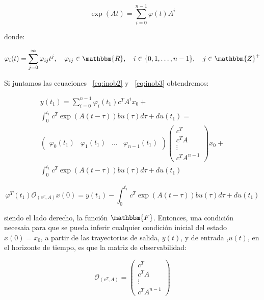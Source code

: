 	\begin{equation} \label{eq:inob3}
		\exp{(At)} = \sum_{i=0}^{n-1} \varphi(t) A^i
	\end{equation}

	donde:

	\begin{equation*}
		\varphi_i(t) = \sum_{j=0}^{\infty} \varphi_{ij} t^j, \quad \varphi_{ij} \in \mathbbm{R}, \quad i \in \{ 0, 1, \dots , n-1 \}, \quad j \in \mathbbm{Z}^+
	\end{equation*}

	Si juntamos las ecuaciones ~\ref{eq:inob2} y ~\ref{eq:inob3} obtendremos:

	\begin{multline*}
		y(t_1) = \sum_{i=0}^{n-1} \varphi_i (t_1) c^T A^i x_0 + \\
		\int_0^{t_1} c^T \exp{\left(A(t - \tau)\right)} b u(\tau) d\tau +d u(t_1) = \\
		\begin{pmatrix}
			\varphi_0(t_1) & \varphi_1(t_1) & \dots & \varphi_{n-1}(t_1)
		\end{pmatrix}
		\begin{pmatrix}
			c^T \\
			c^T A \\
			\vdots \\
			c^T A^{n-1}
		\end{pmatrix} x_0 + \\
		\int_0^{t_1} c^T \exp{\left(A(t - \tau)\right)} b u(\tau) d\tau +d u(t_1)
	\end{multline*}

	\begin{equation} \label{eq:inob4}
		\varphi^T(t_1) \mathcal{O}_{(c^T, A)} x(0) = y(t_1) - \int_0^{t_1} c^T \exp{\left(A(t - \tau)\right)} b u(\tau) d\tau +d u(t_1)
	\end{equation}

	siendo el lado derecho, la función $\mathbbm{F}$. Entonces, una condición necesaia para que se pueda inferir cualquier condición inicial del estado $x(0) = x_0$, a partir de las trayectorias de salida, $y(t)$, y de entrada ,$u(t)$, en el horizonte de tiempo, es que la matriz de observabilidad:

	\begin{equation}
		\mathcal{O}_{(c^T, A)} =
		\begin{pmatrix}
			c^T \\
			c^T A \\
			\vdots \\
			c^T A^{n-1}
		\end{pmatrix}
	\end{equation}

